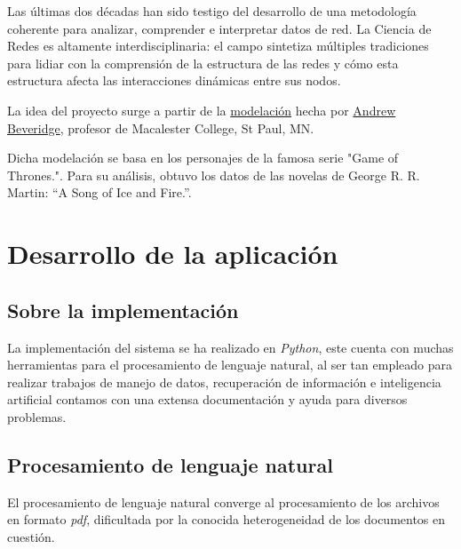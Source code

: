 \documentclass[a4paper,10pt,twocolumn]{article}
\begin{document}
  Las últimas dos décadas han sido testigo del desarrollo de una metodología coherente para analizar, comprender e interpretar datos de red. La Ciencia de Redes es altamente interdisciplinaria: el campo sintetiza múltiples tradiciones para lidiar con la comprensión de la estructura de las redes y cómo esta estructura afecta las interacciones dinámicas entre sus nodos.
  
  La idea del proyecto surge a partir de la \href{https://networkofthrones.wordpress.com/}{modelación} hecha por \href{https://mathbeveridge.github.io/index.html}{Andrew Beveridge}, profesor de Macalester College, St Paul, MN. 
  
  Dicha modelación se basa en los personajes de la famosa serie "Game of Thrones.". Para su análisis, obtuvo los datos de las novelas de George R. R. Martin: “A Song of Ice and Fire.”. 



\section{Desarrollo de la aplicación}\label{sec:dev}
        \subsection{Sobre la implementación}\label{sub:results}

        La implementación del sistema se ha realizado en \emph{Python}, este cuenta con muchas herramientas para el procesamiento de lenguaje natural, al ser tan empleado para realizar trabajos de manejo de datos, recuperación de información e inteligencia artificial contamos con una extensa documentación y ayuda para diversos problemas.

	\subsection{Procesamiento de lenguaje natural}\label{sub:results}
        El procesamiento de lenguaje natural converge al procesamiento de los archivos en formato \emph{pdf}, dificultada por la conocida  heterogeneidad de los documentos en cuestión.
        
\end{document}
